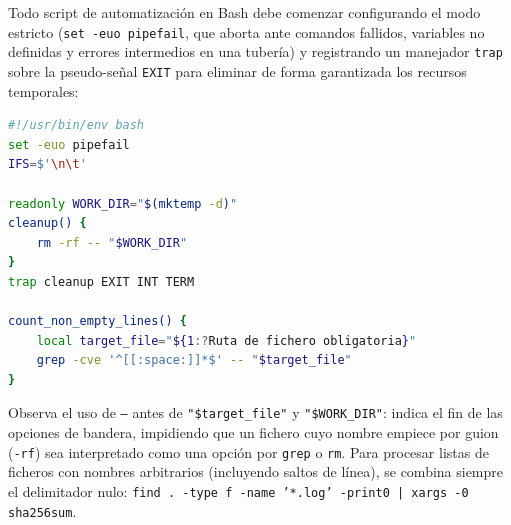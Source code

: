\documentclass{book}
\begin{document}
Todo script de automatización en Bash debe comenzar configurando el modo estricto (\texttt{set -euo pipefail}, que aborta ante comandos fallidos, variables no definidas y errores intermedios en una tubería) y registrando un manejador \texttt{trap} sobre la pseudo-señal \texttt{EXIT} para eliminar de forma garantizada los recursos temporales:
\begin{lstlisting}[style=studium,language={bash}]
#!/usr/bin/env bash
set -euo pipefail
IFS=$'\n\t'

readonly WORK_DIR="$(mktemp -d)"
cleanup() {
    rm -rf -- "$WORK_DIR"
}
trap cleanup EXIT INT TERM

count_non_empty_lines() {
    local target_file="${1:?Ruta de fichero obligatoria}"
    grep -cve '^[[:space:]]*$' -- "$target_file"
}
\end{lstlisting}
Observa el uso de \texttt{--} antes de \texttt{"\$target\_file"} y \texttt{"\$WORK\_DIR"}: indica el fin de las opciones de bandera, impidiendo que un fichero cuyo nombre empiece por guion (\texttt{-rf}) sea interpretado como una opción por \texttt{grep} o \texttt{rm}. Para procesar listas de ficheros con nombres arbitrarios (incluyendo saltos de línea), se combina siempre el delimitador nulo: \texttt{find . -type f -name '*.log' -print0 | xargs -0 sha256sum}.
\end{document}
